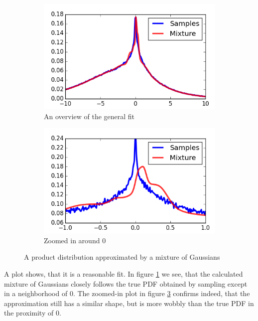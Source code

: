\documentclass[11pt,a4paper]{book}
\begin{document}
\begin{figure}[h]
  \centering
  \begin{subfigure}{0.45\textwidth}
    \centering
    \includegraphics[width=\textwidth]{thesis/theory/gauss-hermite}
    \caption{An overview of the general fit}
    \label{fig:gauss-laguerre}
  \end{subfigure}
  \hfill
  \begin{subfigure}{0.45\textwidth}
    \centering
    \includegraphics[width=\textwidth]{thesis/theory/gauss-hermite-zoomed}
    \caption{Zoomed in around $0$}
    \label{fig:gauss-laguerre-zoomed}
  \end{subfigure}
  \caption{A product distribution approximated by a mixture of Gaussians}
\end{figure}
A plot shows, that it is a reasonable fit. In figure \ref{fig:gauss-laguerre} we
see, that the calculated mixture of Gaussians closely follows the true PDF
obtained by sampling except in a neighborhood of $0$. The zoomed-in plot in
figure \ref{fig:gauss-laguerre-zoomed} confirms indeed, that the approximation
still has a similar shape, but is more wobbly than the true PDF in the proximity
of $0$.
\end{document}
